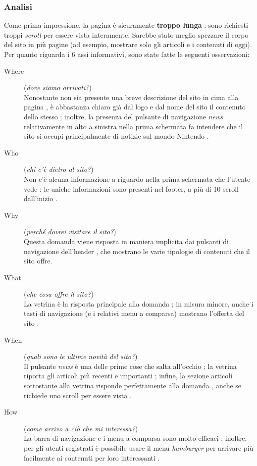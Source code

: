 \subsubsection{Analisi}
\label{sub:home-analisi}
Come prima impressione, la pagina è sicuramente \textbf{troppo lunga} \xmark: sono richiesti troppi \emph{scroll} per essere vista interamente. Sarebbe stato meglio spezzare il corpo del sito in più pagine (ad esempio, mostrare solo gli articoli e i contenuti di oggi).
Per quanto riguarda i 6 assi informativi, sono state fatte le seguenti osservazioni:
\begin{description}
    \item[Where] (\emph{dove siamo arrivati?}) \hfill \\ Nonostante non sia presente una breve descrizione del sito in cima alla pagina \xmark, è abbastanza chiaro già dal logo e dal nome del sito il contenuto dello stesso \cmark; inoltre, la presenza del pulsante di navigazione \emph{news} relativamente in alto a sinistra nella prima schermata fa intendere che il sito si occupi principalmente di notizie sul mondo Nintendo \cmark.
    \item[Who] (\emph{chi c'è dietro al sito?}) \hfill \\ Non c'è alcuna informazione a riguardo nella prima schermata che l'utente vede \xmark: le uniche informazioni sono presenti nel footer, a più di 10 scroll dall'inizio \xmark.
    \item[Why] (\emph{perché dovrei visitare il sito?}) \hfill \\ Questa domanda viene risposta in maniera implicita dai pulsanti di navigazione dell'header \cmark, che mostrano le varie tipologie di contenuti che il sito offre.
    \item[What] (\emph{che cosa offre il sito?}) \hfill \\  La vetrina è la risposta principale alla domanda \cmark; in misura minore, anche i tasti di navigazione (e i relativi menu a comparsa) mostrano l'offerta del sito \cmark.
    \item[When] (\emph{quali sono le ultime novità del sito?}) \hfill \\ Il pulsante \emph{news} è una delle prime cose che salta all'occhio \cmark; la vetrina riporta gli articoli più recenti e importanti \cmark; infine, la sezione articoli sottostante alla vetrina risponde perfettamente alla domanda \cmark, anche se richiede uno scroll per essere vista \xmark.
    \item[How] (\emph{come arrivo a ciò che mi interessa?}) \hfill \\ La barra di navigazione e i menu a comparsa sono molto efficaci \cmark; inoltre, per gli utenti registrati è possibile usare il menu \emph{hamburger} per arrivare più facilmente ai contenuti per loro interessanti \cmark.
\end{description}
